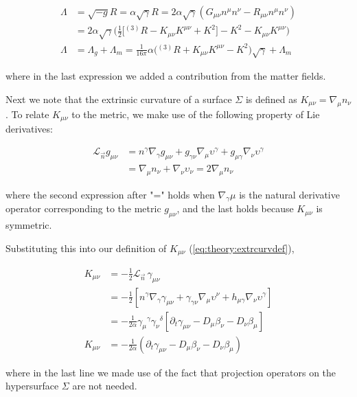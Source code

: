 \documentclass[11pt,a4paper,headinclude=true,DIV=14,BCOR=8mm,chapterprefix,listof=totoc,twoside,openright,abstracton]{scrbook}
\begin{document}
\begin{align}
\Lambda &= \sqrt{-g}R = \alpha\sqrt{\gamma}R 
= 2\alpha\sqrt{\gamma}(G_{\mu\nu}n^{\mu}n^{\nu} - R_{\mu\nu}n^{\mu}n^{\nu})\\ 
&= 2\alpha\sqrt{\gamma}\Bigg(\frac{1}{2}\Big[{^{(3)}R} - K_{\mu\nu}K^{\mu\nu} + K^2 \Big] - K^2 - K_{\mu\nu}K^{\mu\nu}\Bigg) \\
\Lambda &= \Lambda_g+\Lambda_m= \frac{1}{16\pi}\alpha\Big({^{(3)}R} + K_{\mu\nu}K^{\mu\nu} - K^2\Big)\sqrt{\gamma}+\Lambda_m
\end{align}

where in the last expression we added a contribution from the matter fields.

Next we note that the extrinsic curvature of a
surface $\Sigma$ is defined as $K_{\mu\nu} = \nabla_{\mu}n_{\nu}$. To relate $K_{\mu\nu}$ to the metric, we make use of the following property of Lie derivatives:

\begin{align}
\mathcal{L}_{\vec{n}}g_{\mu\nu} &= n^{\gamma}\nabla_{\gamma}g_{\mu\nu} + g_{\gamma\nu}\nabla_{\mu}\upsilon^{\gamma} + g_{\mu\gamma}\nabla_{\nu}\upsilon^{\gamma} \\
&= \nabla_{\mu}n_{\nu}+\nabla_{\nu}\upsilon_{\nu} =2\nabla_{\mu}n_{\nu}
\end{align}

where the second expression after "=" holds when $\nabla_{\gamma}\mu$ is the natural derivative operator corresponding to the metric $g_{\mu\nu}$, and the last holds because $K_{\mu\nu}$ is symmetric.

Substituting this into our definition of $K_{\mu\nu}$ (\ref{eq:theory:extrcurvdef}),

\begin{align}
K_{\mu\nu} 
&= -\frac{1}{2}\mathcal{L}_{\vec{n}\:}\gamma_{\mu\nu} \\
&= -\frac{1}{2}[n^{\gamma}\nabla_{\gamma}\gamma_{\mu\nu} + \gamma_{\gamma\nu}\nabla_{\mu}\upsilon^{\nu} + h_{\mu\gamma}\nabla_{\nu}\upsilon^{\gamma}] \\
&= -\frac{1}{2\alpha}{\gamma_{\mu}}^{\gamma}{\gamma_{\nu}}^{\delta}[\partial_t\gamma_{\mu\nu}-D_{\mu}\beta_{\nu}-D_{\nu}\beta_{\mu}] \\
K_{\mu\nu} &= -\frac{1}{2\alpha}(\partial_t\gamma_{\mu\nu}-D_{\mu}\beta_{\nu}-D_{\nu}\beta_{\mu})
\label{eq:theory:3+1:k_mu_nu}
\end{align}

where in the last line we made use of the fact that  projection operators on the hypersurface $\Sigma$ are not needed.
\end{document}
